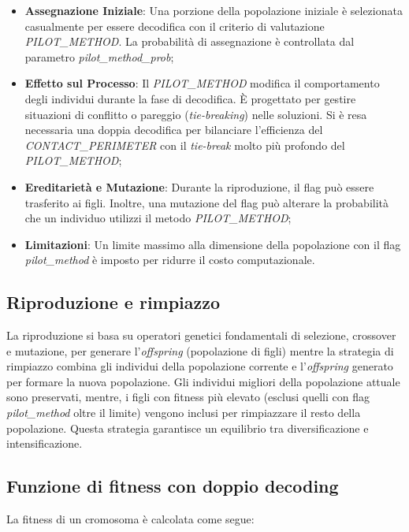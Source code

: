 \begin{itemize}
    \item \textbf{Assegnazione Iniziale}: Una porzione della popolazione iniziale è selezionata casualmente per essere decodifica con il criterio di valutazione \emph{PILOT\_METHOD}. La probabilità di assegnazione è controllata dal parametro \emph{pilot\_method\_prob};
    \item \textbf{Effetto sul Processo}: Il \emph{PILOT\_METHOD} modifica il comportamento degli individui durante la fase di decodifica. È progettato per gestire situazioni di conflitto o pareggio (\emph{tie-breaking}) nelle soluzioni. Si è resa necessaria una doppia decodifica per bilanciare l'efficienza del \emph{CONTACT\_PERIMETER} con il \emph{tie-break} molto più profondo del \emph{PILOT\_METHOD};
    \item \textbf{Ereditarietà e Mutazione}: Durante la riproduzione, il flag può essere trasferito ai figli. Inoltre, una mutazione del flag può alterare la probabilità che un individuo utilizzi il metodo \emph{PILOT\_METHOD};
    \item \textbf{Limitazioni}: Un limite massimo alla dimensione della popolazione con il flag \emph{pilot\_method} è imposto per ridurre il costo computazionale.
\end{itemize}

\subsection{Riproduzione e rimpiazzo}

La riproduzione si basa su operatori genetici fondamentali di selezione, crossover e mutazione, per generare l'\emph{offspring} (popolazione di figli) mentre la strategia di rimpiazzo combina gli individui della popolazione corrente e l'\emph{offspring} generato per formare la nuova popolazione. Gli individui migliori della popolazione attuale sono preservati, mentre, i figli con fitness più elevato (esclusi quelli con flag \emph{pilot\_method} oltre il limite) vengono inclusi per rimpiazzare il resto della popolazione. Questa strategia garantisce un equilibrio tra diversificazione e intensificazione.

\subsection{Funzione di fitness con doppio decoding}

La fitness di un cromosoma è calcolata come segue:

